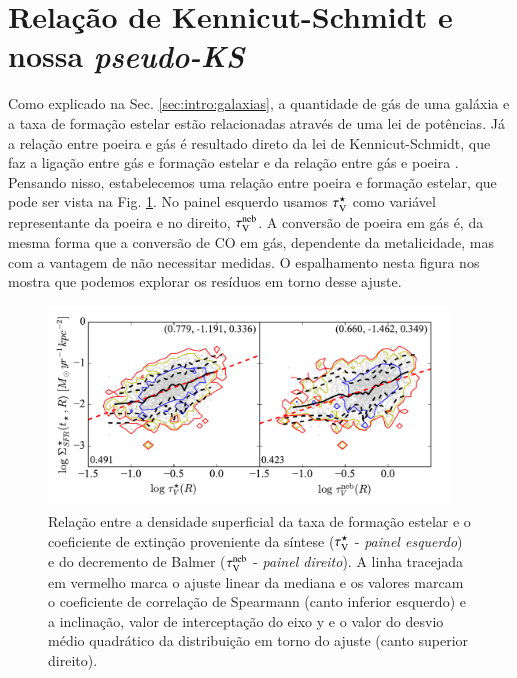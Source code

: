 \section{Relação de Kennicut-Schmidt e nossa {\em pseudo-KS}}
\label{sec:gasfrac:KS}

Como explicado na Sec. \ref{sec:intro:galaxias}, a quantidade de gás de uma galáxia e a taxa de
formação estelar estão relacionadas através de uma lei de potências. Já a relação entre poeira e gás
é resultado direto da lei de Kennicut-Schmidt, que faz a ligação entre gás e formação estelar e da
relação entre gás e poeira \citep[][e suas referências]{Magdis.etal.2011a, Leroy.etal.2011a,
Santini.etal.2014a}. Pensando nisso, estabelecemos uma relação entre poeira e formação estelar, que
pode ser vista na Fig. \ref{fig:pseudoKS}. No painel esquerdo usamos $\tau_{\mathrm{V}}^\star$ como variável
representante da poeira e no direito, $\tau_{\mathrm{V}}^{\mathrm{neb}}$. A conversão de poeira em gás é, da mesma forma que a
conversão de CO em gás, dependente da metalicidade, mas com a vantagem de não necessitar medidas. O
espalhamento nesta figura nos mostra que podemos explorar os resíduos em torno desse ajuste.

\begin{figure}
	\centering
	\includegraphics[width=0.95\textwidth]{figuras/pseudoKS.pdf}
	\caption[Nossa {\em pseudo-KS}.]
	{Relação entre a densidade superficial da taxa de formação estelar e o coeficiente de extinção
proveniente da síntese ($\tau_{\mathrm{V}}^\star$ - {\em painel esquerdo}) e do decremento de Balmer ($\tau_{\mathrm{V}}^{\mathrm{neb}}$ -
{\em painel direito}). A linha tracejada em vermelho marca o ajuste linear da mediana e os
valores marcam o coeficiente de correlação de Spearmann (canto inferior esquerdo) e a
inclinação, valor de interceptação do eixo y e o valor do desvio médio quadrático da distribuição em
torno do ajuste (canto superior direito).}
	\label{fig:pseudoKS}
\end{figure}

